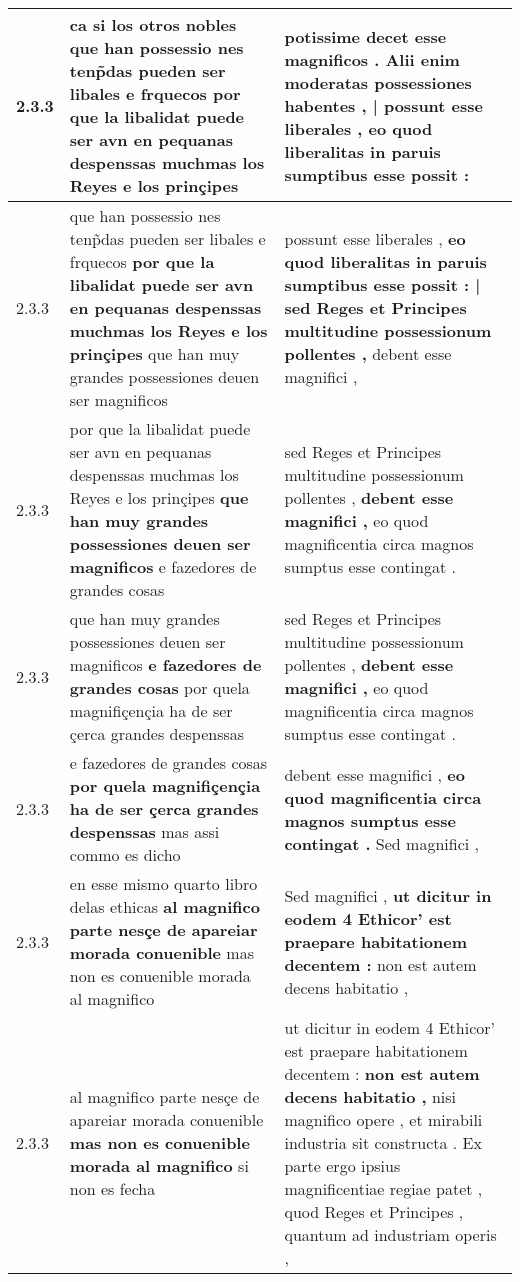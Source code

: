 \begin{tabular}{|p{1cm}|p{6.5cm}|p{6.5cm}|}
2.3.3 & ca si los otros nobles \textbf{ que han possessio nes tenp̃das pueden ser libales e frquecos } por que la libalidat puede ser avn en pequanas despenssas muchmas los Reyes e los prinçipes & potissime decet esse magnificos . \textbf{ Alii enim moderatas possessiones habentes , | possunt esse liberales , } eo quod liberalitas in paruis sumptibus esse possit : \\\hline
2.3.3 & que han possessio nes tenp̃das pueden ser libales e frquecos \textbf{ por que la libalidat puede ser avn en pequanas despenssas muchmas los Reyes e los prinçipes } que han muy grandes possessiones deuen ser magnificos & possunt esse liberales , \textbf{ eo quod liberalitas in paruis sumptibus esse possit : | sed Reges et Principes multitudine possessionum pollentes , } debent esse magnifici , \\\hline
2.3.3 & por que la libalidat puede ser avn en pequanas despenssas muchmas los Reyes e los prinçipes \textbf{ que han muy grandes possessiones deuen ser magnificos } e fazedores de grandes cosas & sed Reges et Principes multitudine possessionum pollentes , \textbf{ debent esse magnifici , } eo quod magnificentia circa magnos sumptus esse contingat . \\\hline
2.3.3 & que han muy grandes possessiones deuen ser magnificos \textbf{ e fazedores de grandes cosas } por quela magnifiçençia ha de ser çerca grandes despenssas & sed Reges et Principes multitudine possessionum pollentes , \textbf{ debent esse magnifici , } eo quod magnificentia circa magnos sumptus esse contingat . \\\hline
2.3.3 & e fazedores de grandes cosas \textbf{ por quela magnifiçençia ha de ser çerca grandes despenssas } mas assi commo es dicho & debent esse magnifici , \textbf{ eo quod magnificentia circa magnos sumptus esse contingat . } Sed magnifici , \\\hline
2.3.3 & en esse mismo quarto libro delas ethicas \textbf{ al magnifico parte nesçe de apareiar morada conuenible } mas non es conuenible morada al magnifico & Sed magnifici , \textbf{ ut dicitur in eodem 4 Ethicor’ est praepare habitationem decentem : } non est autem decens habitatio , \\\hline
2.3.3 & al magnifico parte nesçe de apareiar morada conuenible \textbf{ mas non es conuenible morada al magnifico } si non es fecha & ut dicitur in eodem 4 Ethicor’ est praepare habitationem decentem : \textbf{ non est autem decens habitatio , } nisi magnifico opere , et mirabili industria sit constructa . Ex parte ergo ipsius magnificentiae regiae patet , quod Reges et Principes , quantum ad industriam operis , \\\hline

\end{tabular}

